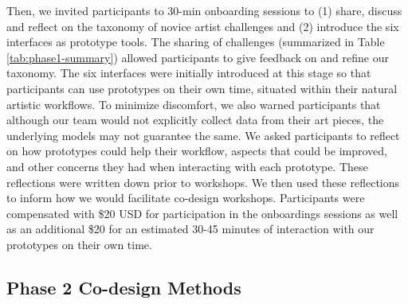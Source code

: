 

Then, we invited participants to 30-min onboarding sessions to (1) share, discuss and reflect on the taxonomy of novice artist challenges and (2) introduce the six interfaces as prototype tools. 
The sharing of challenges (summarized in Table \ref{tab:phase1-summary}) allowed participants to give feedback on and refine our taxonomy. 
The six interfaces were initially introduced at this stage so that participants can use prototypes on their own time, situated within their natural artistic workflows. 
To minimize discomfort, we also warned participants that although our team would not explicitly collect data from their art pieces, the underlying models may not guarantee the same. 
We asked participants to reflect on how prototypes could help their workflow, aspects that could be improved, and other concerns they had when interacting with each prototype. These reflections were written down prior to workshops. 
We then used these reflections to inform how we would facilitate co-design workshops. Participants were compensated with \$20 USD for participation in the onboardings sessions as well as an additional \$20 for an estimated 30-45 minutes of interaction with our prototypes on their own time. 

\subsection{Phase 2 Co-design Methods}
\label{codesign} %


